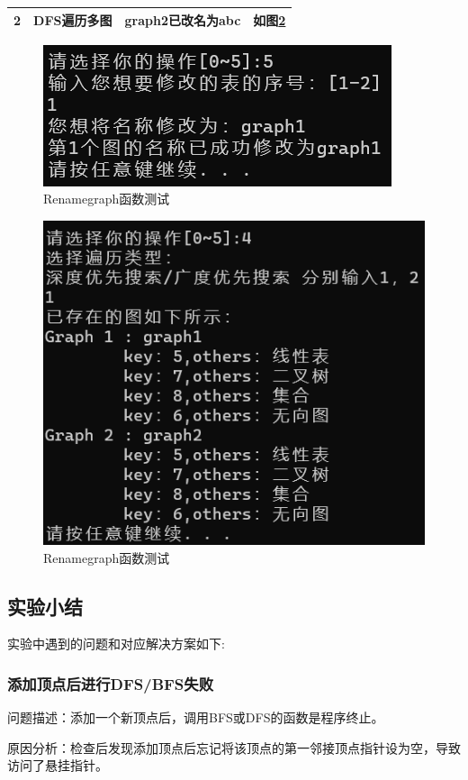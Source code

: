 \documentclass[supercite]{Experimental_Report}
\theoremstyle{definition}
\begin{document}
\begin{enumerate}
\begin{table}[h!]
\begin{center}
\begin{tabular}{|c|p{4cm}<{\centering}|p{4cm}<{\centering}|p{4cm}<{\centering}|}
				\hline
				2 & DFS遍历多图 &graph2已改名为abc &如图\ref{fig2-20-2}\\
				\hline
			\end{tabular}
		\end{center}
	\end{table}
	\begin{figure}[H] %
		\begin{center}
			\includegraphics[width=0.5\linewidth]{images/graph/18-5-1.png}
			\caption{ Renamegraph函数测试}
			\label{fig2-20-1}
		\end{center}
	\end{figure}
	\begin{figure}[H] %
		\begin{center}
			\includegraphics[width=0.5\linewidth]{images/graph/18-5-2.png}
			\caption{ Renamegraph函数测试}
			\label{fig2-20-2}
		\end{center}
	\end{figure}
\end{enumerate}
\subsection{实验小结}
实验中遇到的问题和对应解决方案如下:\par
\subsubsection{添加顶点后进行DFS/BFS失败}
问题描述：添加一个新顶点后，调用BFS或DFS的函数是程序终止。\par

原因分析：检查后发现添加顶点后忘记将该顶点的第一邻接顶点指针设为空，导致访问了悬挂指针。\par
\end{document}

